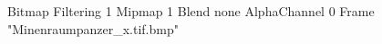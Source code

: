 {Bitmap
	{Filtering 1}
	{Mipmap 1}
	{Blend none}
	{AlphaChannel 0}
	{Frame "Minenraumpanzer_x.tif.bmp"}
}
